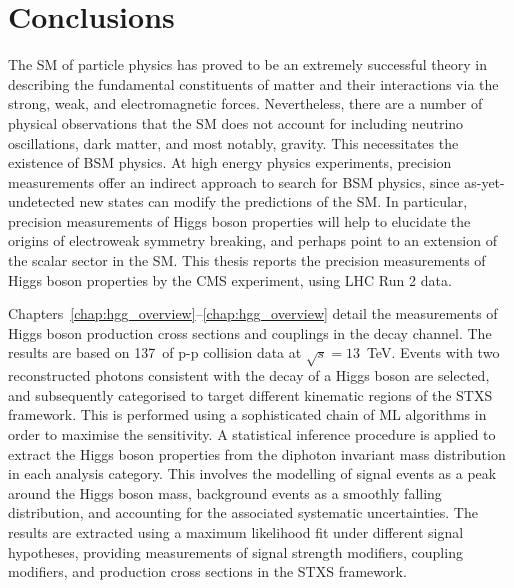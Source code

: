 \chapter{Conclusions}
\label{chap:conclusions}

The SM of particle physics has proved to be an extremely successful theory in describing the fundamental constituents of matter and their interactions via the strong, weak, and electromagnetic forces. Nevertheless, there are a number of physical observations that the SM does not account for including neutrino oscillations, dark matter, and most notably, gravity. This necessitates the existence of BSM physics. At high energy physics experiments, precision measurements offer an indirect approach to search for BSM physics, since as-yet-undetected new states can modify the predictions of the SM. In particular, precision measurements of Higgs boson properties will help to elucidate the origins of electroweak symmetry breaking, and perhaps point to an extension of the scalar sector in the SM.  This thesis reports the precision measurements of Higgs boson properties by the CMS experiment, using LHC Run 2 data.

Chapters~\ref{chap:hgg_overview}--\ref{chap:hgg_overview} detail the measurements of Higgs boson production cross sections and couplings in the \Hgg decay channel. The results are based on 137~\fbinv of p-p collision data at $\sqrt{s}=13$~TeV. Events with two reconstructed photons consistent with the decay of a Higgs boson are selected, and subsequently categorised to target different kinematic regions of the STXS framework. This is performed using a sophisticated chain of ML algorithms in order to maximise the sensitivity. A statistical inference procedure is applied to extract the Higgs boson properties from the diphoton invariant mass distribution in each analysis category. This involves the modelling of signal events as a peak around the Higgs boson mass, background events as a smoothly falling distribution, and accounting for the associated systematic uncertainties. The results are extracted using a maximum likelihood fit under different signal hypotheses, providing measurements of signal strength modifiers, coupling modifiers, and production cross sections in the STXS framework.

